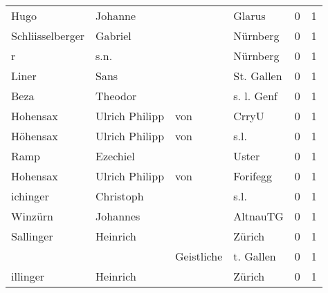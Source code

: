 \begin{center}
\begin{tiny}
\begin{longtabu}{llllrr}
                     Hugo &                            Johanne &             &                                      Glarus &          0 &         1 \\
         Schliisselberger &                            Gabriel &             &                                    Nürnberg &          0 &         1 \\
                        r &                               s.n. &             &                                    Nürnberg &          0 &         1 \\
                    Liner &                               Sans &             &                                  St. Gallen &          0 &         1 \\
                     Beza &                            Theodor &             &                                  s. l. Genf &          0 &         1 \\
                 Hohensax &                     Ulrich Philipp &         von &                                       CrryU &          0 &         1 \\
                 Höhensax &                     Ulrich Philipp &         von &                                        s.l. &          0 &         1 \\
                     Ramp &                           Ezechiel &             &                                       Uster &          0 &         1 \\
                 Hohensax &                     Ulrich Philipp &         von &                                    Forifegg &          0 &         1 \\
                 ichinger &                          Christoph &             &                                        s.l. &          0 &         1 \\
                  Winzürn &                           Johannes &             &                                    AltnauTG &          0 &         1 \\
                Sallinger &                           Heinrich &             &                                      Zürich &          0 &         1 \\
                          &                                    &  Geistliche &                                   t. Gallen &          0 &         1 \\
                 illinger &                           Heinrich &             &                                      Zürich &          0 &         1 \\

\end{longtabu}
\end{tiny}
\end{center}
